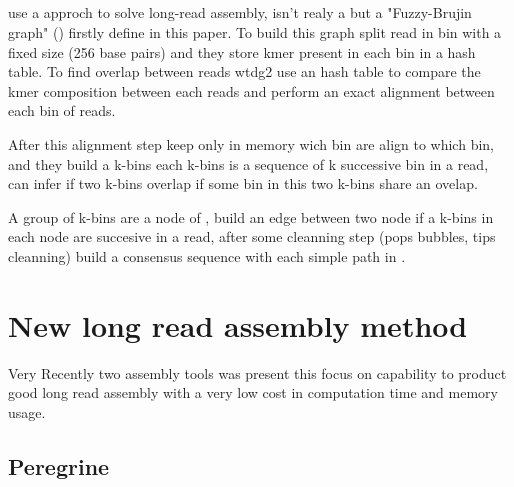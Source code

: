 \documentclass[main]{subfiles}
\begin{document}
 

\subsection{\wtdbg}

\wtdbg \cite{wtdbg2}  use a \DBG approch to solve long-read assembly, isn't realy a \DBG but a "Fuzzy-Brujin graph" () firstly define in this paper. To build this graph \wtdbg split read in bin with a fixed size (256 base pairs) and they store kmer present in each bin in a hash table.
To find overlap between reads wtdg2 use an hash table to compare the kmer composition between each reads and perform an exact alignment between each bin of reads. 

After this alignment step \wtdbg keep only in memory wich bin are align to which bin, and they build a k-bins each k-bins is a sequence of k successive bin in a read, \wtdbg can infer if two k-bins overlap if some bin in this two k-bins share an ovelap.

A group of k-bins are a node of , \wtdbg build an edge between two node if a k-bins in each node are succesive in a read, after some cleanning step (pops bubbles, tips cleanning) \wtdbg build a consensus sequence with each simple path in .

\section{New long read assembly method}

Very Recently two assembly tools was present this focus on capability to product good long read assembly with a very low cost in computation time and memory usage.

\subsection{Peregrine}

\newcommand{\shimmer}{\toolsname{SHIMMER}}
\end{document}

